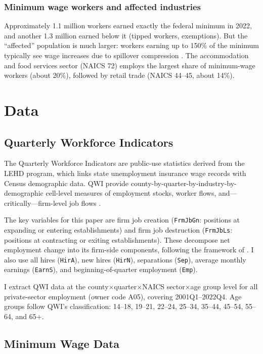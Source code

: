 \documentclass[12pt]{article}
\begin{document}
\subsubsection*{Minimum wage workers and affected industries} Approximately 1.1 million workers earned exactly the federal minimum in 2022, and another 1.3 million earned below it (tipped workers, exemptions). But the ``affected'' population is much larger: workers earning up to 150\% of the minimum typically see wage increases due to spillover compression \citep{autor2016contribution, lee2010minimum}. The accommodation and food services sector (NAICS 72) employs the largest share of minimum-wage workers (about 20\%), followed by retail trade (NAICS 44--45, about 14\%).


\section{Data}

\subsection{Quarterly Workforce Indicators}

The Quarterly Workforce Indicators are public-use statistics derived from the LEHD program, which links state unemployment insurance wage records with Census demographic data. QWI provide county-by-quarter-by-industry-by-demographic cell-level measures of employment stocks, worker flows, and---critically---firm-level job flows \citep{abowd2009lehd}.

The key variables for this paper are firm job creation (\texttt{FrmJbGn}: positions at expanding or entering establishments) and firm job destruction (\texttt{FrmJbLs}: positions at contracting or exiting establishments). These decompose net employment change into its firm-side components, following the framework of \citet{davis1992gross}. I also use all hires (\texttt{HirA}), new hires (\texttt{HirN}), separations (\texttt{Sep}), average monthly earnings (\texttt{EarnS}), and beginning-of-quarter employment (\texttt{Emp}).

I extract QWI data at the county$\times$quarter$\times$NAICS sector$\times$age group level for all private-sector employment (owner code A05), covering 2001Q1--2022Q4. Age groups follow QWI's classification: 14--18, 19--21, 22--24, 25--34, 35--44, 45--54, 55--64, and 65+.

\subsection{Minimum Wage Data}
\end{document}
